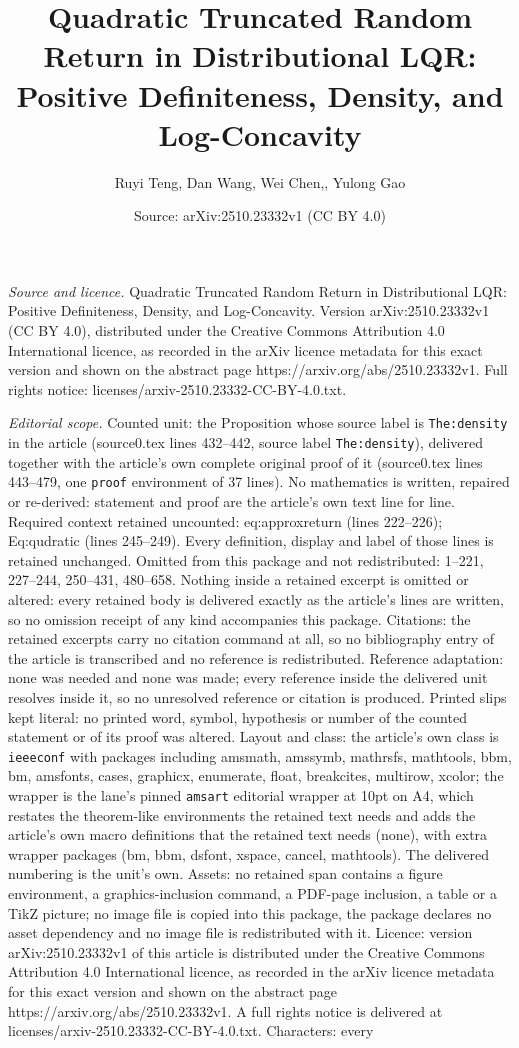 \documentclass[10pt,a4paper]{amsart}
\title[Quadratic Truncated Random Return in Distributional LQR: Pos]{Quadratic Truncated Random Return in Distributional LQR: Positive Definiteness, Density, and Log-Concavity}
\author{Ruyi Teng, Dan Wang, Wei Chen,, Yulong Gao}
\date{Source: arXiv:2510.23332v1 (CC BY 4.0)}
\begin{document}
\maketitle

\noindent\emph{Source and licence.} Quadratic Truncated Random Return in Distributional LQR: Positive Definiteness, Density, and Log-Concavity. Version arXiv:2510.23332v1 (CC BY 4.0), distributed under the Creative Commons Attribution 4.0 International licence, as recorded in the arXiv licence metadata for this exact version and shown on the abstract page https://arxiv.org/abs/2510.23332v1. Full rights notice: licenses/arxiv-2510.23332-CC-BY-4.0.txt.\par\smallskip

\noindent\textit{Editorial scope.} Counted unit: the Proposition whose source label is \texttt{The:density} in the article (source0.tex lines 432--442, source label \texttt{The:density}), delivered together with the article's own complete original proof of it (source0.tex lines 443--479, one \texttt{proof} environment of 37 lines). No mathematics is written, repaired or re-derived: statement and proof are the article's own text line for line. Required context retained uncounted: eq:approxreturn (lines 222--226); Eq:qudratic (lines 245--249). Every definition, display and label of those lines is retained unchanged. Omitted from this package and not redistributed: 1--221, 227--244, 250--431, 480--658. Nothing inside a retained excerpt is omitted or altered: every retained body is delivered exactly as the article's lines are written, so no omission receipt of any kind accompanies this package. Citations: the retained excerpts carry no citation command at all, so no bibliography entry of the article is transcribed and no reference is redistributed. Reference adaptation: none was needed and none was made; every reference inside the delivered unit resolves inside it, so no unresolved reference or citation is produced. Printed slips kept literal: no printed word, symbol, hypothesis or number of the counted statement or of its proof was altered. Layout and class: the article's own class is \texttt{ieeeconf} with packages including amsmath, amssymb, mathrsfs, mathtools, bbm, bm, amsfonts, cases, graphicx, enumerate, float, breakcites, multirow, xcolor; the wrapper is the lane's pinned \texttt{amsart} editorial wrapper at 10pt on A4, which restates the theorem-like environments the retained text needs and adds the article's own macro definitions that the retained text needs (none), with extra wrapper packages (bm, bbm, dsfont, xspace, cancel, mathtools). The delivered numbering is the unit's own. Assets: no retained span contains a figure environment, a graphics-inclusion command, a PDF-page inclusion, a table or a TikZ picture; no image file is copied into this package, the package declares no asset dependency and no image file is redistributed with it. Licence: version arXiv:2510.23332v1 of this article is distributed under the Creative Commons Attribution 4.0 International licence, as recorded in the arXiv licence metadata for this exact version and shown on the abstract page https://arxiv.org/abs/2510.23332v1. A full rights notice is delivered at licenses/arxiv-2510.23332-CC-BY-4.0.txt. Characters: every 
\end{document}

